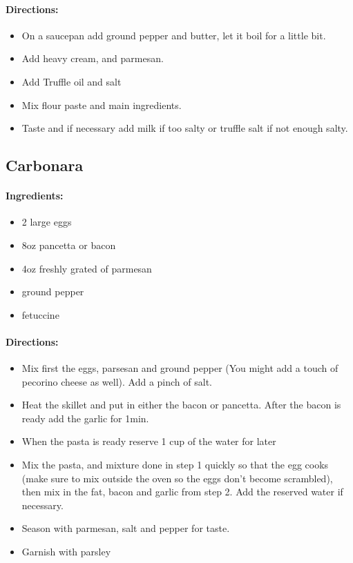\documentclass{article}
\begin{document}
\paragraph{Directions:}
\begin{itemize}
    \item On a saucepan add ground pepper and butter, let it boil for a little bit.
    \item Add heavy cream, and parmesan.
    \item Add Truffle oil and salt
    \item Mix flour paste and main ingredients.
    \item Taste and if necessary add milk if too salty or truffle salt if not enough salty.
\end{itemize}

\subsection{Carbonara}

\paragraph{Ingredients:}
\begin{itemize}
    \item 2 large eggs
    \item 8oz pancetta or bacon
    \item 4oz freshly grated of parmesan
    \item ground pepper
    \item fetuccine
\end{itemize}

\paragraph{Directions:}
\begin{itemize}
    \item Mix first the eggs, parsesan and ground pepper (You might add a touch of pecorino cheese as well). Add a pinch of salt.
    \item Heat the skillet and put in either the bacon or pancetta. After the bacon is ready add the garlic for 1min.
    \item When the pasta is ready reserve 1 cup of the water for later
    \item Mix the pasta, and mixture done in step 1 quickly so that the egg cooks (make sure to mix outside the oven so the eggs don’t become scrambled), then mix in the fat, bacon and garlic from step 2. Add the reserved water if necessary.
    \item Season with parmesan, salt and pepper for taste.
    \item Garnish with parsley
\end{itemize}
\end{document}
